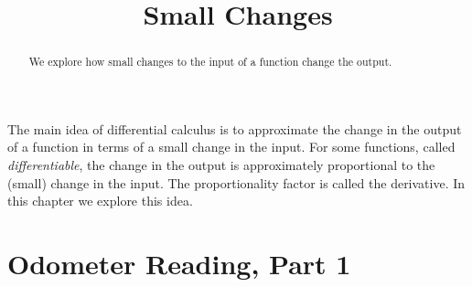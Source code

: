 \documentclass{ximera}
\title{Small Changes}
\begin{document}
\begin{abstract}
We explore how small changes to the input of a function change the output.
\end{abstract}
\maketitle

The main idea of differential calculus is to approximate the change in the output of a function in terms of a small change in the input. For some functions, called \emph{differentiable}, the change in the output is approximately proportional to the (small) change in the input. The proportionality factor is called the derivative. In this chapter we explore this idea.


\section{Odometer Reading, Part 1}
\end{document}
